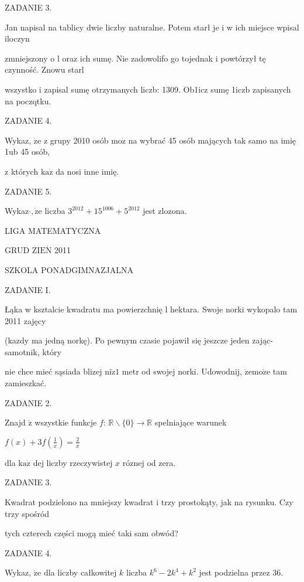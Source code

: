 \documentclass[a4paper,12pt]{article}
\begin{document}
ZADANIE 3.

Jan napisal na tablicy dwie liczby naturalne. Potem starł je i w ich miejsce wpisal iloczyn

zmniejszony o l oraz ich sumę. Nie zadowolifo go tojednak i powtórzył tę czynność. Znowu starl

wszystko i zapisal sumę otrzymanych liczb: 1309. Ob1icz sumę 1iczb zapisanych na poczqtku.

ZADANIE 4.

Wykaz, $\dot{\mathrm{z}}\mathrm{e}$ z grupy 2010 osób $\mathrm{m}\mathrm{o}\dot{\mathrm{z}}$ na wybrać 45 osób mających tak samo na imię 1ub 45 osób,

z których $\mathrm{k}\mathrm{a}\dot{\mathrm{z}}$ da nosi inne imię.

ZADANIE 5.

Wykaz$\cdot, \dot{\mathrm{z}}\mathrm{e}$ liczba $3^{2012}+15^{1006}+5^{2012}$ jest zlozona.






LIGA MATEMATYCZNA

GRUD Z$\mathrm{I}\mathrm{E}\acute{\mathrm{N}}$ 2011

SZKOLA PONADGIMNAZJALNA

ZADANIE I.

Łąka w ksztalcie kwadratu ma powierzchnię l hektara. Swoje norki wykopalo tam 2011 zajęcy

(kazdy ma jedną norkę). Po pewnym czasie pojawił się jeszcze jeden zając- samotnik, który

nie chce mieć sąsiada blizej $\mathrm{n}\mathrm{i}\dot{\mathrm{z}}1$ metr od swojej norki. Udowodnij, $\dot{\mathrm{z}}\mathrm{e}\mathrm{m}\mathrm{o}\dot{\mathrm{z}}\mathrm{e}$ tam zamieszkać.

ZADANIE 2.

Znajd $\acute{\mathrm{z}}$ wszystkie funkcje $f$: $\mathbb{R}\backslash \{0\}\rightarrow \mathbb{R}$ spelniające warunek

$f(x)+3f(\displaystyle \frac{1}{x})=\frac{2}{x}$

dla $\mathrm{k}\mathrm{a}\dot{\mathrm{z}}$ dej liczby rzeczywistej $x$ róznej od zera.

ZADANIE 3.

Kwadrat podzielono na mniejszy kwadrat i trzy prostokąty, jak na rysunku. Czy trzy spośród

tych czterech części mogą mieć taki sam obwód?

ZADANIE 4.

Wykaz, $\dot{\mathrm{z}}\mathrm{e}$ dla liczby całkowitej $k$ liczba $k^{6}-2k^{4}+k^{2}$ jest podzielna przez 36.
\end{document}
